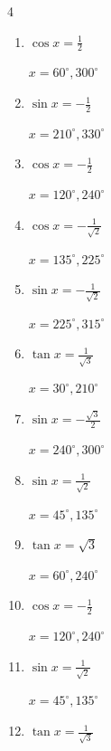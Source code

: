 \begin{multicols}{4}
\begin{enumerate}
        $\displaystyle x = 60^{\circ} , 120^{\circ}$

  \item $\displaystyle \cos{x}  = \frac{1}{2}$

        $\displaystyle x = 60^{\circ} , 300^{\circ}$

  \item $\displaystyle \sin{x}  = -\frac{1}{2}$

        $\displaystyle x = 210^{\circ} , 330^{\circ}$

  \item $\displaystyle \cos{x}  = -\frac{1}{2}$

        $\displaystyle x = 120^{\circ} , 240^{\circ}$

  \item $\displaystyle \cos{x}  = -\frac{1}{\sqrt{2}}$

        $\displaystyle x = 135^{\circ} , 225^{\circ}$

  \item $\displaystyle \sin{x}  = -\frac{1}{\sqrt{2}}$

        $\displaystyle x = 225^{\circ} , 315^{\circ}$

  \item $\displaystyle \tan{x}  = \frac{1}{\sqrt{3}}$

        $\displaystyle x = 30^{\circ} , 210^{\circ}$

  \item $\displaystyle \sin{x}  = -\frac{\sqrt{3}}{2}$

        $\displaystyle x = 240^{\circ} , 300^{\circ}$

  \item $\displaystyle \sin{x}  = \frac{1}{\sqrt{2}}$

        $\displaystyle x = 45^{\circ} , 135^{\circ}$

  \item $\displaystyle \tan{x}  = \sqrt{3}$

        $\displaystyle x = 60^{\circ} , 240^{\circ}$

  \item $\displaystyle \cos{x}  = -\frac{1}{2}$

        $\displaystyle x = 120^{\circ} , 240^{\circ}$

  \item $\displaystyle \sin{x}  = \frac{1}{\sqrt{2}}$

        $\displaystyle x = 45^{\circ} , 135^{\circ}$

  \item $\displaystyle \tan{x}  = \frac{1}{\sqrt{3}}$


\end{enumerate}
\end{multicols}
